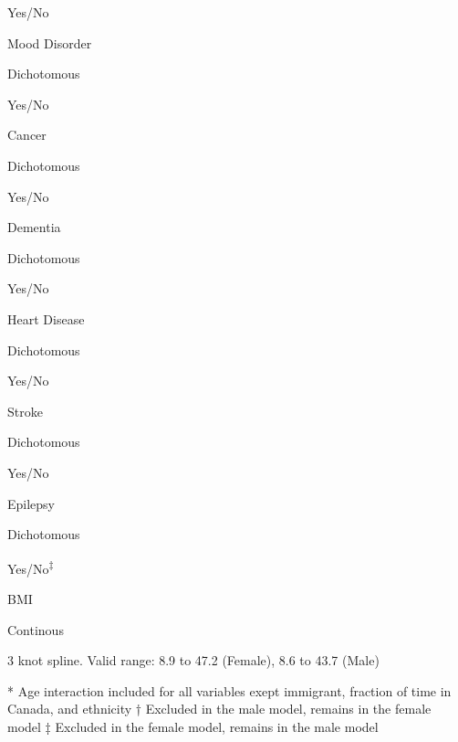 \documentclass[]{book}
\begin{document}
Yes/No

Mood Disorder

Dichotomous

Yes/No

Cancer

Dichotomous

Yes/No

Dementia

Dichotomous

Yes/No

Heart Disease

Dichotomous

Yes/No

Stroke

Dichotomous

Yes/No

Epilepsy

Dichotomous

Yes/No\textsuperscript{‡}

BMI

Continous

3 knot spline. Valid range: 8.9 to 47.2 (Female), 8.6 to 43.7 (Male)

* Age interaction included for all variables exept immigrant, fraction
of time in Canada, and ethnicity † Excluded in the male model, remains
in the female model ‡ Excluded in the female model, remains in the male
model


\end{document}
